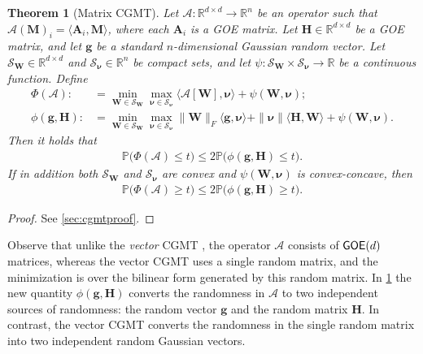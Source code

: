 \documentclass[10pt]{article}
\newcommand{\p}{\mathbb{P}}
\newtheorem{theorem}{Theorem}
\theoremstyle{definition}
\begin{document}
\begin{theorem}[Matrix CGMT] \label{thm:matrixcgmt}
Let $\mathcal{A}: \mathbb{R}^{d \times d} \to \mathbb{R}^{n}$ be an operator such that $\mathcal{A}( \bm{M})_i =\langle \bm{A}_i, \bm{M} \rangle $, where each $\bm{A}_i$ is a GOE matrix. Let $\bm{H} \in \mathbb{R}^{d\times d}$ be a GOE matrix, and let $\bm{g}$ be a standard $n$-dimensional Gaussian random vector.  Let $\mathcal{S}_{\bm{W}} \in \mathbb{R}^{d\times d}$ and $\mathcal{S}_{\bm{\nu}} \in \mathbb{R}^{n}$ be compact sets, and let $\psi: \mathcal{S}_{\bm{W}} \times \mathcal{S}_{\bm{\nu}} \to \mathbb{R}$ be a continuous function.  Define
\begin{align}
    \Phi(\mathcal{A}) :&= \min_{\bm{W}\in \mathcal{S}_{\bm{W}}} \max_{\bm{\nu} \in \mathcal{S}_{\bm{\nu}}} \langle \mathcal{A}[ \bm{W}], \bm{\nu} \rangle  + \psi(\bm{W}, \bm{\nu}); \\
    \phi(\bm{g},\bm{H}) :&= \min_{\bm{W}\in \mathcal{S}_{\bm{W}}} \max_{\bm{\nu} \in \mathcal{S}_{\bm{\nu}}} \| \bm{W} \|_F \langle \bm{g}, \bm{\nu} \rangle  + \| \bm{\nu}\| \langle \bm{H}, \bm{W} \rangle + \psi(\bm{W}, \bm{\nu}).
\end{align}
Then it holds that
\begin{align}
    \p\bigg(  \Phi(\mathcal{A})  \leq  t \bigg) \leq 2 \p \bigg(  \phi(\bm{g,H})  \leq t\bigg). 
\end{align}
If in addition both $\mathcal{S}_{\bm{W}}$ and $\mathcal{S}_{\bm{\nu}}$ are convex and $\psi(\bm{W},\bm{\nu})$ is convex-concave, then
\begin{align}
    \p\bigg(  \Phi(\mathcal{A})  \geq  t \bigg) \leq 2 \p \bigg(  \phi(\bm{g,H})  \geq t\bigg). 
\end{align}
\end{theorem}
\begin{proof}
    See \cref{sec:cgmtproof}. 
\end{proof}
Observe that unlike the \emph{vector} CGMT \citep{thrampoulidis_gaussian_2015}, the operator $\mathcal{A}$ consists of ${\sf GOE}(d)$ matrices, whereas the vector CGMT uses a single random matrix, and the minimization is over the bilinear form generated by this random matrix.  In \cref{thm:matrixcgmt} the new quantity $\phi(\bm{g},\bm{H})$ converts the randomness in $\mathcal{A}$ to two independent sources of randomness: the random vector $\bm{g}$ and the random matrix $\bm{H}$.  In contrast, the vector CGMT converts the randomness in the single random matrix into two independent random Gaussian vectors.  
\end{document}
